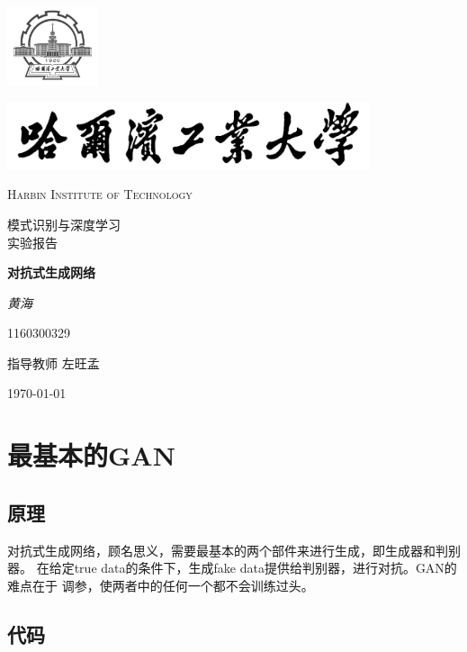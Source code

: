 \documentclass[12pt, a4paper]{report}
\begin{document}
 
\begin{titlepage}
	\centering
	\includegraphics[width=0.2\textwidth]{sf1.png}\par
	\vspace{1cm}
	\includegraphics[width=0.8\textwidth]{sf.jpg}\par
	\vspace{0.1cm}
	{\scshape\LARGE Harbin Institute of Technology \par}
	\vspace{1cm}
	{\kaishu\LARGE 模式识别与深度学习\\实验报告\par}
	\vspace{1.5cm}
	{\huge\bfseries 对抗式生成网络\par}
	\vspace{2cm}
	{\fangsong\Large\itshape 黄海\par}
	\vfill
	{1160300329}\par
	\vfill
	指导教师	\textsc{左旺孟}
	\vfill
	{\large \today\par}
\end{titlepage}

\sc
\tableofcontents
\newpage

\chapter{最基本的GAN}
\section{原理}

对抗式生成网络，顾名思义，需要最基本的两个部件来进行生成，即生成器和判别器。
在给定true data的条件下，生成fake data提供给判别器，进行对抗。GAN的难点在于
调参，使两者中的任何一个都不会训练过头。

\section{代码}
\end{document}
